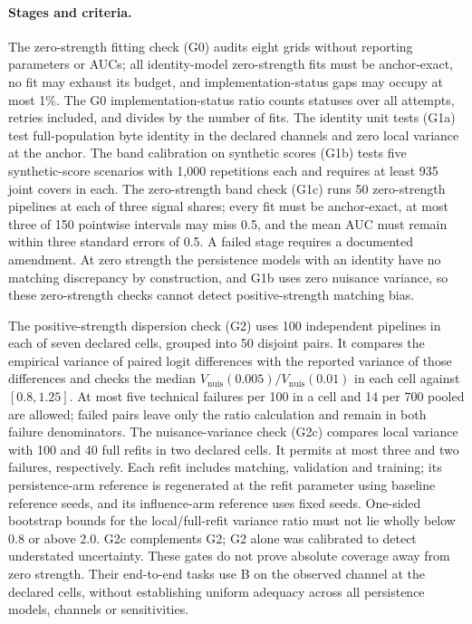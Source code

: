 \paragraph{Stages and criteria.}
The zero-strength fitting check (G0) audits eight grids without reporting parameters or AUCs; all identity-model zero-strength fits must be anchor-exact, no fit may exhaust its budget, and implementation-status gaps may occupy at most 1\%. The G0 implementation-status ratio counts statuses over all attempts, retries included, and divides by the number of fits. %
The identity unit tests (G1a) test full-population byte identity in the declared channels and zero local variance at the anchor. The band calibration on synthetic scores (G1b) tests five synthetic-score scenarios with 1,000 repetitions each and requires at least 935 joint covers in each. The zero-strength band check (G1c) runs 50 zero-strength pipelines at each of three signal shares; every fit must be anchor-exact, at most three of 150 pointwise intervals may miss 0.5, and the mean AUC must remain within three standard errors of 0.5. A failed stage requires a documented amendment. At zero strength the persistence models with an identity have no matching discrepancy by construction, and G1b uses zero nuisance variance, so these zero-strength checks cannot detect positive-strength matching bias. %

The positive-strength dispersion check (G2) uses 100 independent pipelines in each of seven declared cells, grouped into 50 disjoint pairs. It compares the empirical variance of paired logit differences with the reported variance of those differences and checks the median $V_{\mathrm{nuis}}(0.005)/V_{\mathrm{nuis}}(0.01)$ in each cell against $[0.8,1.25]$. At most five technical failures per 100 in a cell and 14 per 700 pooled are allowed; failed pairs leave only the ratio calculation and remain in both failure denominators. The nuisance-variance check (G2c) compares local variance with 100 and 40 full refits in two declared cells. It permits at most three and two failures, respectively. Each refit includes matching, validation and training; its persistence-arm reference is regenerated at the refit parameter using baseline reference seeds, and its influence-arm reference uses fixed seeds. One-sided bootstrap bounds for the local/full-refit variance ratio must not lie wholly below 0.8 or above 2.0. G2c complements G2; G2 alone was calibrated to detect understated uncertainty. These gates do not prove absolute coverage away from zero strength. Their end-to-end tasks use B on the observed channel at the declared cells, without establishing uniform adequacy across all persistence models, channels or sensitivities. %

